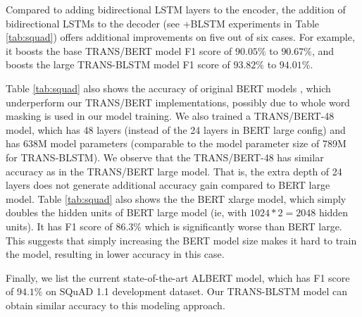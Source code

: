 \documentclass[11pt,a4paper]{article}
\begin{document}
Compared to adding bidirectional LSTM layers to the encoder, the addition of bidirectional LSTMs to the decoder (see +BLSTM experiments in Table \ref{tab:squad}) offers additional improvements on five out of six cases. For example, it boosts the base TRANS/BERT model F1 score of $90.05\%$ to $90.67\%$, and boosts the large TRANS-BLSTM model F1 score of $93.82\%$ to $94.01\%$. 

Table \ref{tab:squad} also shows the accuracy of original BERT models \cite{devlin2018}, which underperform our TRANS/BERT implementations, possibly due to whole word masking is used in our model training.  We also trained a TRANS/BERT-48 model, which has 48 layers (instead of the 24 layers in BERT large config) and has 638M model parameters (comparable to the model parameter size of 789M for TRANS-BLSTM). We observe that the TRANS/BERT-48 has similar accuracy as in the TRANS/BERT large model. That is, the extra depth of 24 layers does not generate additional accuracy gain compared to BERT large model. Table   
\ref{tab:squad}  also shows the the BERT xlarge model, which simply doubles the hidden units of BERT large model (ie, with $1024*2=2048$ hidden units). It has F1 score of $86.3\%$ which is significantly worse than BERT large. This suggests that simply increasing the BERT model size makes it hard to train the model, resulting in lower accuracy in this case.

Finally, we list the current state-of-the-art ALBERT model, which has F1 score of $94.1\%$ on SQuAD 1.1 development dataset. Our TRANS-BLSTM model can obtain similar accuracy to this modeling approach. 
\end{document}
